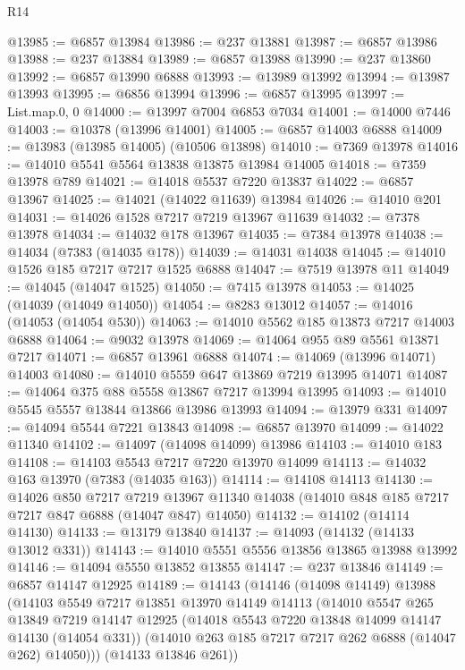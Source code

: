 \begin{lexlean}{R14}
\begin{coremodule}
@13985 := @6857 @13984
@13986 := @237 @13881
@13987 := @6857 @13986
@13988 := @237 @13884
@13989 := @6857 @13988
@13990 := @237 @13860
@13992 := @6857 @13990 @6888
@13993 := @13989 @13992
@13994 := @13987 @13993
@13995 := @6856 @13994
@13996 := @6857 @13995
@13997 := List.map.{0, 0}
@14000 := @13997 @7004 @6853 @7034
@14001 := @14000 @7446
@14003 := @10378 (@13996 @14001)
@14005 := @6857 @14003 @6888
@14009 := @13983 (@13985 @14005) (@10506 @13898)
@14010 := @7369 @13978
@14016 := @14010 @5541 @5564 @13838 @13875 @13984 @14005
@14018 := @7359 @13978 @789
@14021 := @14018 @5537 @7220 @13837
@14022 := @6857 @13967
@14025 := @14021 (@14022 @11639) @13984
@14026 := @14010 @201
@14031 := @14026 @1528 @7217 @7219 @13967 @11639
@14032 := @7378 @13978
@14034 := @14032 @178 @13967
@14035 := @7384 @13978
@14038 := @14034 (@7383 (@14035 @178))
@14039 := @14031 @14038
@14045 := @14010 @1526 @185 @7217 @7217 @1525 @6888
@14047 := @7519 @13978 @11
@14049 := @14045 (@14047 @1525)
@14050 := @7415 @13978
@14053 := @14025 (@14039 (@14049 @14050))
@14054 := @8283 @13012
@14057 := @14016 (@14053 (@14054 @530))
@14063 := @14010 @5562 @185 @13873 @7217 @14003 @6888
@14064 := @9032 @13978
@14069 := @14064 @955 @89 @5561 @13871 @7217
@14071 := @6857 @13961 @6888
@14074 := @14069 (@13996 @14071) @14003
@14080 := @14010 @5559 @647 @13869 @7219 @13995 @14071
@14087 := @14064 @375 @88 @5558 @13867 @7217 @13994 @13995
@14093 := @14010 @5545 @5557 @13844 @13866 @13986 @13993
@14094 := @13979 @331
@14097 := @14094 @5544 @7221 @13843
@14098 := @6857 @13970
@14099 := @14022 @11340
@14102 := @14097 (@14098 @14099) @13986
@14103 := @14010 @183
@14108 := @14103 @5543 @7217 @7220 @13970 @14099
@14113 := @14032 @163 @13970 (@7383 (@14035 @163))
@14114 := @14108 @14113
@14130 := @14026
    @850
    @7217
    @7219
    @13967
    @11340
    @14038
    (@14010 @848 @185 @7217 @7217 @847 @6888 (@14047 @847) @14050)
@14132 := @14102 (@14114 @14130)
@14133 := @13179 @13840
@14137 := @14093 (@14132 (@14133 @13012 @331))
@14143 := @14010 @5551 @5556 @13856 @13865 @13988 @13992
@14146 := @14094 @5550 @13852 @13855
@14147 := @237 @13846
@14149 := @6857 @14147 @12925
@14189 := @14143
    (@14146
      (@14098 @14149)
      @13988
      (@14103
        @5549
        @7217
        @13851
        @13970
        @14149
        @14113
        (@14010
          @5547
          @265
          @13849
          @7219
          @14147
          @12925
          (@14018 @5543 @7220 @13848 @14099 @14147 @14130 (@14054 @331))
          (@14010 @263 @185 @7217 @7217 @262 @6888 (@14047 @262) @14050)))
      (@14133 @13846 @261))

\end{coremodule}
\end{lexlean}
